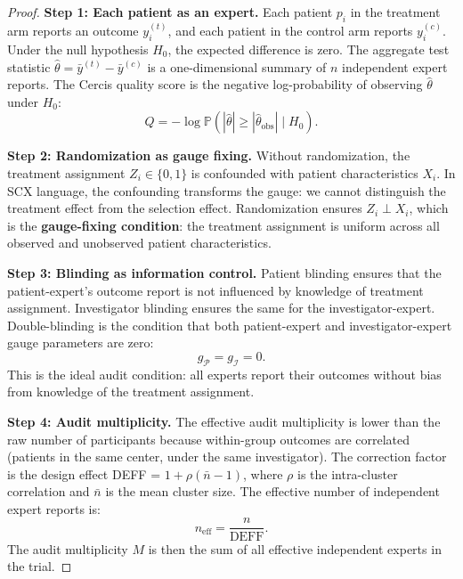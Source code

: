 \documentclass[12pt,a4paper]{article}
\theoremstyle{remark}
\newcommand{\Pbb}{\mathbb{P}}
\newcommand{\SCX}{\textsf{SCX}}
\newcommand{\Cercis}{\textsf{Cercis}}
\begin{document}
\begin{proof}
\noindent\textbf{Step 1: Each patient as an expert.}
Each patient $p_i$ in the treatment arm reports an outcome $y_i^{(t)}$, and
each patient in the control arm reports $y_i^{(c)}$. Under the null hypothesis
$H_0$, the expected difference is zero. The aggregate test statistic
$\hat{\theta} = \bar{y}^{(t)} - \bar{y}^{(c)}$ is a one-dimensional summary
of $n$ independent expert reports. The \Cercis{} quality score is the
negative log-probability of observing $\hat{\theta}$ under $H_0$:
\begin{equation}
  Q = -\log \Pbb(|\hat{\theta}| \geq |\hat{\theta}_{\text{obs}}| \mid H_0).
\end{equation}

\smallskip
\noindent\textbf{Step 2: Randomization as gauge fixing.}
Without randomization, the treatment assignment $Z_i \in \{0, 1\}$ is
confounded with patient characteristics $X_i$. In \SCX{} language, the
confounding transforms the gauge: we cannot distinguish the treatment effect
from the selection effect. Randomization ensures $Z_i \perp X_i$, which is
the \textbf{gauge-fixing condition}: the treatment assignment is uniform
across all observed and unobserved patient characteristics.

\smallskip
\noindent\textbf{Step 3: Blinding as information control.}
Patient blinding ensures that the patient-expert's outcome report is not
influenced by knowledge of treatment assignment. Investigator blinding
ensures the same for the investigator-expert. Double-blinding is the
condition that both patient-expert and investigator-expert gauge
parameters are zero:
\begin{equation}
  g_{\mathcal{P}} = g_{\mathcal{I}} = 0.
\end{equation}
This is the ideal audit condition: all experts report their outcomes without
bias from knowledge of the treatment assignment.

\smallskip
\noindent\textbf{Step 4: Audit multiplicity.}
The effective audit multiplicity is lower than the raw number of
participants because within-group outcomes are correlated (patients in
the same center, under the same investigator). The correction factor is
the design effect DEFF = $1 + \rho(\bar{n} - 1)$, where $\rho$ is the
intra-cluster correlation and $\bar{n}$ is the mean cluster size. The
effective number of independent expert reports is:
\begin{equation}
  n_{\text{eff}} = \frac{n}{\text{DEFF}}.
\end{equation}
The audit multiplicity $M$ is then the sum of all effective independent
experts in the trial.
\end{proof}
\end{document}
